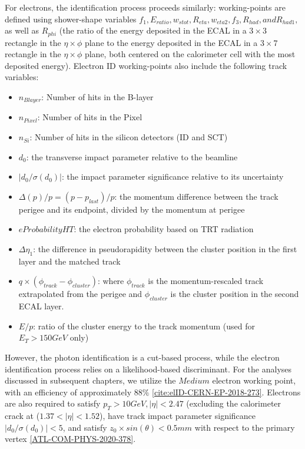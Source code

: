 For electrons, the identification process proceeds similarly: working-points are defined using shower-shape variables $f_{1}, E_{ratio}, w_{s tot}, R_{eta}, w_{eta2}, f_{3}, R_{had}, and R_{had1},$ as well as $R_{phi}$ (the ratio of the energy deposited in the ECAL in a $3 \times 3$ rectangle in the $\eta \times \phi$ plane to the energy deposited in the ECAL in a $3 \times 7$ rectangle in the $\eta \times \phi$ plane, both centered on the calorimeter cell with the most deposited energy). Electron ID working-points also include the following track variables:
\begin{itemize}
\item $n_{Blayer}$: Number of hits in the B-layer
\item $n_{Pixel}$: Number of hits in the Pixel
\item $n_{Si}$: Number of hits in the silicon detectors (ID and SCT)
\item $d_{0}$: the transverse impact parameter relative to the beamline
\item $|d_{0} / \sigma(d_{0})|$: the impact parameter significance relative to its uncertainty
\item $\Delta(p)/p = (p-p_{last})/p$: the momentum difference between the track perigee and its endpoint, divided by the momentum at perigee
\item $eProbabilityHT$: the electron probability based on TRT radiation
\item $\Delta \eta_{1}$: the difference in pseudorapidity between the cluster position in the first layer and the matched track
\item $q \times (\phi_{track}-\phi_{cluster})$: where $\phi_{track}$ is the momentum-rescaled track extrapolated from the perigee and $\phi_{cluster}$ is the cluster position in the second ECAL layer.
\item $E/p$: ratio of the cluster energy to the track momentum (used for $E_{T} > 150 GeV$ only) 
\end{itemize}

However, the photon identification is a cut-based process, while the electron identification process relies on a likelihood-based discriminant. For the analyses discussed in subsequent chapters, we utilize the $Medium$ electron working point, with an efficiency of approximately 88$\%$ \ref{cite:elID-CERN-EP-2018-273}. Electrons are also required to satisfy $p_{T} > 10 GeV, |\eta| < 2.47$ (excluding the calorimeter crack at ($1.37<|\eta|<1.52$), have track impact parameter significance $|d_{0} / \sigma(d_{0})| < 5$, and satisfy $z_{0} \times sin(\theta) < 0.5 mm$ with respect to the primary vertex \ref{ATL-COM-PHYS-2020-378}.

